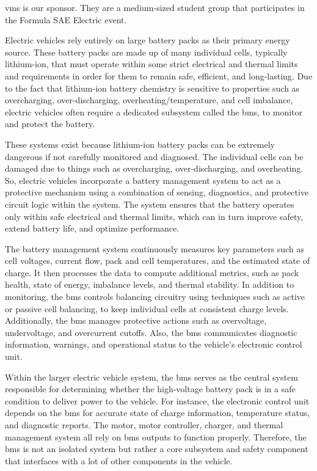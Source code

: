 \gls{vms} is our sponsor. They are a medium-sized student group that participates in the Formula SAE Electric event.


Electric vehicles rely entirely on large battery packs as their primary energy source. These battery packs are made up of many individual cells, typically lithium-ion, that must operate within some strict electrical and thermal limits and requirements in order for them to remain safe, efficient, and long-lasting. Due to the fact that lithium-ion battery chemistry is sensitive to properties such as overcharging, over-discharging, overheating/temperature, and cell imbalance, electric vehicles often require a dedicated subsystem called the \gls{bms}, to monitor and protect the battery.

These systems exist because lithium-ion battery packs can be extremely dangerous if not carefully monitored and diagnosed. The individual cells can be damaged due to things such as overcharging, over-discharging, and overheating. So, electric vehicles incorporate a battery management system to act as a protective mechanism using a combination of sensing, diagnostics, and protective circuit logic within the system. The system ensures that the battery operates only within safe electrical and thermal limits, which can in turn improve safety, extend battery life, and optimize performance.

The battery management system continuously measures key parameters such as cell voltages, current flow, pack and cell temperatures, and the estimated state of charge. It then processes the data to compute additional metrics, such as pack health, state of energy, imbalance levels, and thermal stability. In addition to monitoring, the \gls{bms} controls balancing circuitry using techniques such as active or passive cell balancing, to keep individual cells at consistent charge levels. Additionally, the \gls{bms} manages protective actions such as overvoltage, undervoltage, and overcurrent cutoffs. Also, the \gls{bms} communicates diagnostic information, warnings, and operational status to the vehicle’s electronic control unit.

Within the larger electric vehicle system, the \gls{bms} serves as the central system responsible for determining whether the high-voltage battery pack is in a safe condition to deliver power to the vehicle. For instance, the electronic control unit depends on the \gls{bms} for accurate state of charge information, temperature status, and diagnostic reports. The motor, motor controller, charger, and thermal management system all rely on \gls{bms} outputs to function properly. Therefore, the \gls{bms} is not an isolated system but rather a core subsystem and safety component that interfaces with a lot of other components in the vehicle.

